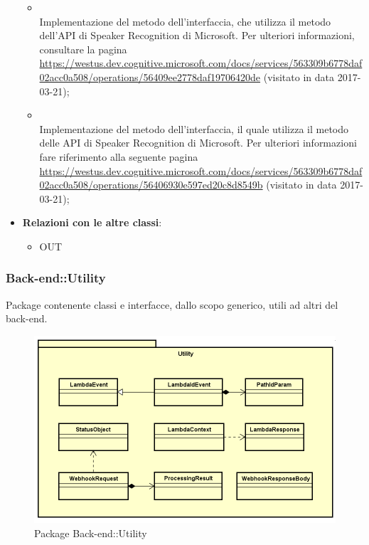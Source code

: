 \begin{itemize}
\begin{itemize}
		\item[]  \\		Implementazione del metodo dell'interfaccia, che utilizza il metodo  dell'API di Speaker Recognition di Microsoft. Per ulteriori informazioni, consultare la pagina \url{https://westus.dev.cognitive.microsoft.com/docs/services/563309b6778daf02acc0a508/operations/56409ee2778daf19706420de}  (visitato in data 2017-03-21);\\
		\item[]  \\		Implementazione del metodo dell'interfaccia, il quale utilizza il metodo  delle API di Speaker Recognition di Microsoft. Per ulteriori informazioni fare riferimento alla seguente pagina \url{https://westus.dev.cognitive.microsoft.com/docs/services/563309b6778daf02acc0a508/operations/56406930e597ed20c8d8549b}  (visitato in data 2017-03-21);\\
	\end{itemize}
	\item \textbf{Relazioni con le altre classi}:
	\begin{itemize}
		\item OUT \hyperlink{VocalLoginModuleConfig_label}{}
	\end{itemize}
\end{itemize}
\FloatBarrier

\subsubsection{Back-end::Utility}
Package contenente classi e interfacce, dallo scopo generico, utili ad altri  del back-end.
\begin{figure}[h] \centering \includegraphics[width=\textwidth,height=\textheight,keepaspectratio]{images/diagrams/back-end/Official_Backend_0304/Utility.png}
	\caption{Package Back-end::Utility}
\end{figure}
\newpage
